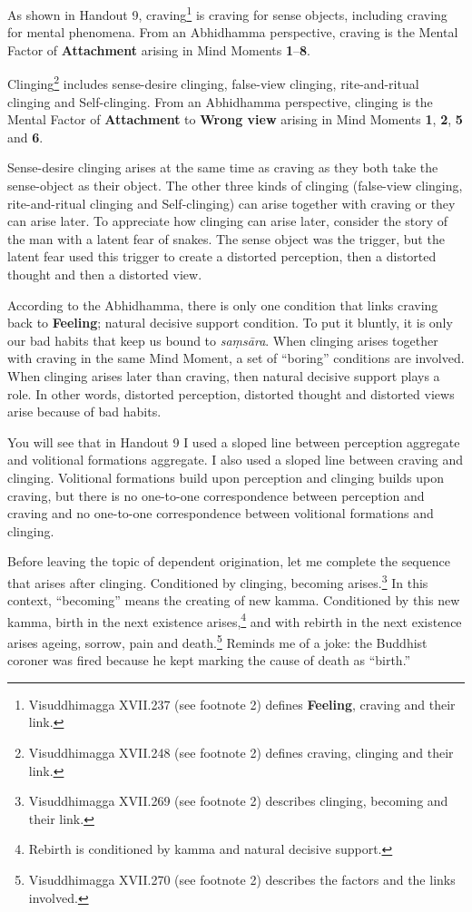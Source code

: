 As shown in Handout 9, craving\footnote{Visuddhimagga XVII.237 (see footnote 2) defines \textbf{Feeling}, craving and their link.} is craving for sense objects, including craving for mental phenomena. From an Abhidhamma perspective, craving is the Mental Factor of \textbf{Attachment} arising in Mind Moments \textbf{1}--\textbf{8}.

Clinging\footnote{Visuddhimagga XVII.248 (see footnote 2) defines craving, clinging and their link.} includes sense-desire clinging, false-view clinging, rite-and-ritual clinging and Self-clinging. From an Abhidhamma perspective, clinging is the Mental Factor of \textbf{Attachment} to \textbf{Wrong view} arising in Mind Moments \textbf{1}, \textbf{2}, \textbf{5} and \textbf{6}.

Sense-desire clinging arises at the same time as craving as they both take the sense-object as their object. The other three kinds of clinging (false-view clinging, rite-and-ritual clinging and Self-clinging) can arise together with craving or they can arise later. To appreciate how clinging can arise later, consider the story of the man with a latent fear of snakes. The sense object was the trigger, but the latent fear used this trigger to create a distorted perception, then a distorted thought and then a distorted view.

According to the Abhidhamma, there is only one condition that links craving back to \textbf{Feeling}; natural decisive support condition. To put it bluntly, it is only our bad habits that keep us bound to \textit{saṃsāra}. When clinging arises together with craving in the same Mind Moment, a set of “boring” conditions are involved. When clinging arises later than craving, then natural decisive support plays a role. In other words, distorted perception, distorted thought and distorted views arise because of bad habits.

You will see that in Handout 9 I used a sloped line between perception aggregate and volitional formations aggregate. I also used a sloped line between craving and clinging. Volitional formations build upon perception and clinging builds upon craving, but there is no one-to-one correspondence between perception and craving and no one-to-one correspondence between volitional formations and clinging.

Before leaving the topic of dependent origination, let me complete the sequence that arises after clinging. Conditioned by clinging, becoming arises.\footnote{Visuddhimagga XVII.269 (see footnote 2) describes clinging, becoming and their link.} In this context, “becoming” means the creating of new kamma. Conditioned by this new kamma, birth in the next existence arises,\footnote{Rebirth is conditioned by kamma and natural decisive support.} and with rebirth in the next existence arises ageing, sorrow, pain and death.\footnote{Visuddhimagga XVII.270 (see footnote 2) describes the factors and the links involved.} Reminds me of a joke: the Buddhist coroner was fired because he kept marking the cause of death as “birth.” 

